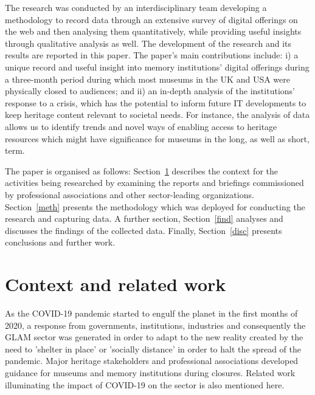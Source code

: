 \documentclass{egpubl}
\begin{document}
The research was conducted by an interdisciplinary team developing a methodology to record data through an extensive survey of digital offerings on the web and then analysing them quantitatively, while providing useful insights through qualitative analysis as well. The development of the research and its results are reported in this paper. The paper’s main contributions include: i) a unique record and useful insight into memory institutions’ digital offerings during a three-month period during which most museums in the UK and USA were physically closed to audiences; and ii) an in-depth analysis of the institutions' response to a crisis, which has the potential to inform future IT developments to keep heritage content relevant to societal needs. For instance, the analysis of data allows us to identify trends and novel ways of enabling access to heritage resources which might have significance for museums in the long, as well as short, term. 

The paper is organised as follows: Section~\ref{conrel} describes the context for the activities being researched by examining the reports and briefings commissioned by professional associations and other sector-leading organizations. Section~\ref{meth} presents the methodology which was deployed for conducting the research and capturing data. A further section, Section~\ref{find} analyses and discusses the findings of the collected data. Finally, Section~\ref{disc} presents conclusions and further work.  

\section{Context and related work}
\label{conrel}
As the COVID-19 pandemic started to engulf the planet in the first months of 2020, a response from governments, institutions, industries and consequently the GLAM sector was generated in order to adapt to the new reality created by the need to 'shelter in place' or 'socially distance' in order to halt the spread of the pandemic. Major heritage stakeholders and professional associations developed guidance for museums and memory institutions during closures. Related work illuminating the impact of COVID-19 on the sector is also mentioned here.
\end{document}

